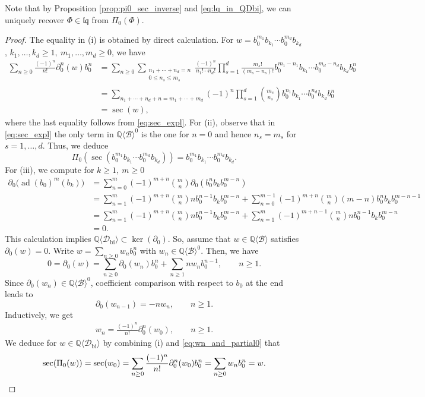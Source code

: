 \documentclass[12pt,reqno]{amsart}
\numberwithin{equation}{section}
\theoremstyle{definition}
\newcommand{\QQ}{\mathbb{Q}}
\newcommand{\ad}{\operatorname{ad}}
\newcommand{\B}{\mathcal{B}}
\newcommand{\QB}{\QQ\langle \B\rangle}
\newcommand{\Dbi}{\mathcal{D}_{\operatorname{bi}}}
\newcommand{\QDbi}{\QQ\langle \Dbi\rangle}
\newcommand{\lqq}{\mathfrak{lq}}
\newcommand{\pizero}{\Pi_0}
\begin{document}
Note that by Proposition \ref{prop:pi0_sec_inverse} and \eqref{eq:lq_in_QDbi}, we can uniquely recover $\Phi\in \lqq$ from $\pizero(\Phi)$.

\begin{proof}
The equality in (i) is obtained by direct calculation. For $w=b_0^{m_1}b_{k_1}\cdots b_0^{m_d}b_{k_d}$, $k_1,\ldots,k_d\geq1,\ m_1,\ldots,m_d\geq0$, we have
\begin{align*}
\sum_{n\geq0} \frac{(-1)^n}{n!} \partial_0^n(w)b_0^n&=\sum_{n\geq0}\sum_{\substack{n_1+\cdots+n_d=n \\ 0\leq n_s\leq m_s}} \frac{(-1)^n}{n_1!\cdots n_d!} \prod_{s=1}^d \frac{m_s!}{(m_s-n_s)!} b_0^{m_1-n_1}b_{k_1}\cdots b_0^{m_d-n_d}b_{k_d}b_0^n \nonumber\\
&=\sum_{n_1+\cdots+n_d+n=m_1+\cdots+m_d} (-1)^n \prod_{s=1}^d \binom{m_s}{n_s} b_0^{n_1}b_{k_1}\cdots b_0^{n_d}b_{k_d}b_0^n \nonumber\\
&=\sec(w),
\end{align*}
where the last equality follows from \eqref{eq:sec_expl}.
For (ii), observe that in \eqref{eq:sec_expl} the only term in $\QB^0$ is the one for $n=0$ and hence $n_s=m_s$ for $s=1,\ldots,d$. Thus, we deduce
\[\pizero(\sec(b_0^{m_1}b_{k_1}\cdots b_0^{m_d}b_{k_d}))=b_0^{m_1}b_{k_1}\cdots b_0^{m_d}b_{k_d}.\]
For (iii), we compute for $k\geq1,\ m\geq0$
\begin{align*}
\partial_0\big(\ad(b_0)^m(b_k)\big)&=\sum_{n=0}^m (-1)^{m+n} \binom{m}{n} \partial_0(b_0^nb_kb_0^{m-n}) \\
&=\sum_{n=1}^m (-1)^{m+n} \binom{m}{n} n b_0^{n-1}b_kb_0^{m-n} + \sum_{n=0}^{m-1} (-1)^{m+n} \binom{m}{n} (m-n)b_0^nb_kb_0^{m-n-1} \\
&=\sum_{n=1}^m (-1)^{m+n} \binom{m}{n} n b_0^{n-1}b_kb_0^{m-n} + \sum_{n=1}^{m} (-1)^{m+n-1} \binom{m}{n} nb_0^{n-1}b_kb_0^{m-n} \\
&=0.
\end{align*}
This calculation implies $\QDbi \subset \ker(\partial_0)$. So, assume that $w\in \QB$ satisfies $\partial_0(w)=0$. Write $w=\sum_{n\geq0} w_nb_0^n$ with $w_n\in\QB^0$. Then, we have
\[0=\partial_0(w)=\sum_{n\geq0} \partial_0(w_n)b_0^n+\sum_{n\geq1} n w_nb_0^{n-1},\qquad n\geq1.\]
Since $\partial_0(w_n)\in\QB^0$, coefficient comparison with respect to $b_0$ at the end leads to
\[\partial_0(w_{n-1})=-nw_n, \qquad n\geq1. \]
Inductively, we get
\begin{align} \label{eq:wn_and_partial0} 
w_n=\frac{(-1)^n}{n!} \partial_0^n(w_0),\qquad n\geq1.
\end{align}
 We deduce for $w\in \QDbi$  by combining (i) and \eqref{eq:wn_and_partial0} that
\[\sec(\pizero(w))=\sec(w_0)= \sum_{n\geq0} \frac{(-1)^n}{n!} \partial_0^n(w_0)b_0^n=\sum_{n\geq0} w_nb_0^n=w. \qedhere \]
\end{proof}
\end{document}
